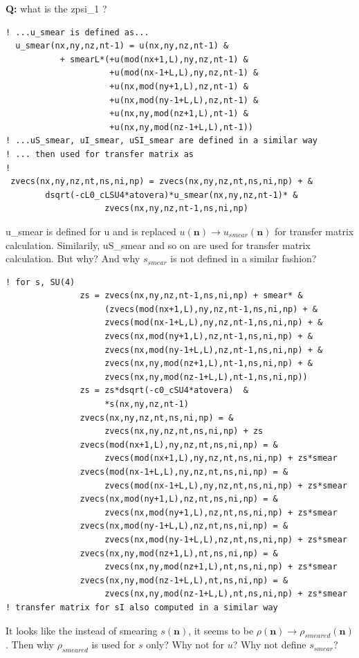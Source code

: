 \documentclass[10pt]{book}
\def\bm{\boldsymbol}
\def\vn{{\bm n}}
\begin{document}
{\bf Q:} what is the zpsi\_1 ?

\begin{lstlisting}[frame=single]
! ...u_smear is defined as...
  u_smear(nx,ny,nz,nt-1) = u(nx,ny,nz,nt-1) &
           + smearL*(+u(mod(nx+1,L),ny,nz,nt-1) &
                     +u(mod(nx-1+L,L),ny,nz,nt-1) &
                     +u(nx,mod(ny+1,L),nz,nt-1) &
                     +u(nx,mod(ny-1+L,L),nz,nt-1) &
                     +u(nx,ny,mod(nz+1,L),nt-1) &
                     +u(nx,ny,mod(nz-1+L,L),nt-1))
! ...uS_smear, uI_smear, uSI_smear are defined in a similar way
! ... then used for transfer matrix as
!
 zvecs(nx,ny,nz,nt,ns,ni,np) = zvecs(nx,ny,nz,nt,ns,ni,np) + &
        dsqrt(-cL0_cLSU4*atovera)*u_smear(nx,ny,nz,nt-1)* &
                    zvecs(nx,ny,nz,nt-1,ns,ni,np)

\end{lstlisting}  
u\_smear is defined for u and is replaced $u(\vn)\to u_{smear}(\vn)$
for transfer matrix calculation. Similarily, uS\_smear and so on are used
for transfer matrix calculation.
But why? And why $s_{smear}$ is not defined in a similar fashion?

\begin{lstlisting}[frame=single]
! for s, SU(4) 
               zs = zvecs(nx,ny,nz,nt-1,ns,ni,np) + smear* &
                    (zvecs(mod(nx+1,L),ny,nz,nt-1,ns,ni,np) + &
                    zvecs(mod(nx-1+L,L),ny,nz,nt-1,ns,ni,np) + &
                    zvecs(nx,mod(ny+1,L),nz,nt-1,ns,ni,np) + &
                    zvecs(nx,mod(ny-1+L,L),nz,nt-1,ns,ni,np) + &
                    zvecs(nx,ny,mod(nz+1,L),nt-1,ns,ni,np) + &
                    zvecs(nx,ny,mod(nz-1+L,L),nt-1,ns,ni,np))
               zs = zs*dsqrt(-c0_cSU4*atovera)  &
                    *s(nx,ny,nz,nt-1)
               zvecs(nx,ny,nz,nt,ns,ni,np) = &
                    zvecs(nx,ny,nz,nt,ns,ni,np) + zs
               zvecs(mod(nx+1,L),ny,nz,nt,ns,ni,np) = &
                    zvecs(mod(nx+1,L),ny,nz,nt,ns,ni,np) + zs*smear
               zvecs(mod(nx-1+L,L),ny,nz,nt,ns,ni,np) = &
                    zvecs(mod(nx-1+L,L),ny,nz,nt,ns,ni,np) + zs*smear
               zvecs(nx,mod(ny+1,L),nz,nt,ns,ni,np) = &
                    zvecs(nx,mod(ny+1,L),nz,nt,ns,ni,np) + zs*smear
               zvecs(nx,mod(ny-1+L,L),nz,nt,ns,ni,np) = &
                    zvecs(nx,mod(ny-1+L,L),nz,nt,ns,ni,np) + zs*smear
               zvecs(nx,ny,mod(nz+1,L),nt,ns,ni,np) = &
                    zvecs(nx,ny,mod(nz+1,L),nt,ns,ni,np) + zs*smear
               zvecs(nx,ny,mod(nz-1+L,L),nt,ns,ni,np) = &
                    zvecs(nx,ny,mod(nz-1+L,L),nt,ns,ni,np) + zs*smear
! transfer matrix for sI also computed in a similar way                  
\end{lstlisting}
It looks like the instead of smearing $s(\vn)$, it seems to be 
$\rho(\vn)\to\rho_{smeared}(\vn)$. Then why $\rho_{smeared}$ is used for $s$ only?
Why not for $u$? Why not define $s_{smear}$?
\end{document}

